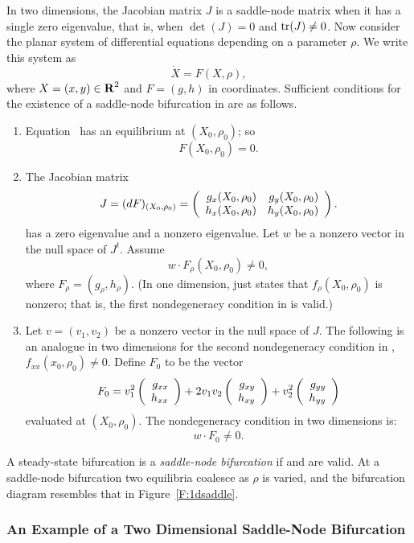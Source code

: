 In two dimensions, the Jacobian matrix $J$ is a saddle-node matrix when
it has a single zero eigenvalue, that is, when $\det(J)=0$ and 
${\rm tr}(J)\neq 0$.  Now consider the planar system of differential equations 
depending on a parameter $\rho$.  We write this system as
\begin{equation}  \label{e:2deqn}
\dot{X} = F(X,\rho),
\end{equation}
where $X=(x,y)\in\mbox{$\bf{R}$}^2$ and $F=(g,h)$ in coordinates.  Sufficient conditions
for the existence of a saddle-node bifurcation in  are as follows.
\begin{enumerate}
\item Equation~ has an equilibrium at $(X_0,\rho_0)$; so 
\[
F(X_0,\rho_0) = 0.
\]
\item  The Jacobian matrix 
\[
J=(dF)_{(X_0,\rho_0)}=
\left(\begin{array}{rr} g_x(X_0,\rho_0) & g_y(X_0,\rho_0)\\ h_x(X_0,\rho_0) &h_y(X_0,\rho_0)\end{array}\right).
\]
has a zero eigenvalue and a nonzero eigenvalue.  Let $w$ be a nonzero vector 
in the null space of $J^t$.  Assume
\begin{equation}  \label{e:2deig}
w \cdot F_\rho(X_0,\rho_0) \neq 0,
\end{equation}
where $F_\rho=(g_\rho,h_\rho)$.  (In one dimension,  just states 
that $f_\rho(X_0,\rho_0)$ is nonzero; that is, the first
nondegeneracy condition in 
 is valid.) 
\item   Let $v=(v_1,v_2)$ be a nonzero vector in the null space of $J$.
The following is an analogue in two dimensions for the second nondegeneracy
condition in , $f_{xx}(x_0,\rho_0)\neq 0$. Define $F_0$ to 
be the vector
\[
F_0 = v_1^2\left(\begin{array}{r} g_{xx} \\ h_{xx}\end{array}\right) + 2v_1v_2\left(\begin{array}{r} g_{xy} \\ h_{xy}\end{array}\right)
+ v_2^2 \left(\begin{array}{r} g_{yy} \\ h_{yy}\end{array}\right)  
\]
evaluated at $(X_0,\rho_0)$.  The nondegeneracy condition in two dimensions
is:
\begin{equation}  \label{e:2dbifur}
w \cdot F_0 \neq 0.
\end{equation}
\end{enumerate}
A steady-state bifurcation is a {\em saddle-node bifurcation\/} if 
 and  are valid.  At a saddle-node bifurcation 
two equilibria coalesce as $\rho$ is varied, and the bifurcation diagram 
resembles that in Figure~\ref{F:1dsaddle}.

\subsubsection*{An Example of a Two Dimensional Saddle-Node Bifurcation}


